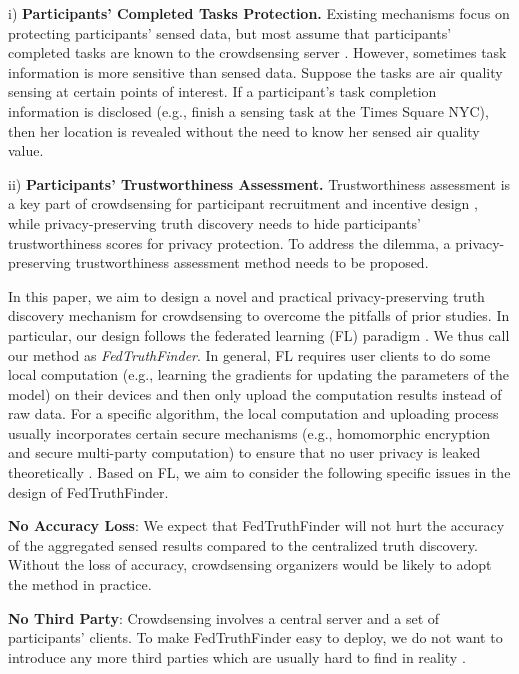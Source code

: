 i) \textbf{Participants' Completed Tasks Protection.} Existing mechanisms focus on protecting participants' sensed data, but most assume that participants' completed tasks are known to the crowdsensing server \citep{Xu2019EfficientAP,Miao2015CloudEnabledPT,Miao2019PrivacyPreservingTD,Zheng2018LearningTT}. However, sometimes task information is more sensitive than sensed data. Suppose the tasks are air quality sensing at certain points of interest. If a participant's task completion information is disclosed (e.g., finish a sensing task at the Times Square NYC), then her location is revealed without the need to know her sensed air quality value.

ii)  \textbf{Participants' Trustworthiness Assessment.} Trustworthiness assessment is a key part of crowdsensing for participant recruitment and incentive design \citep{Peng2018DataQG}, while privacy-preserving truth discovery needs to hide participants' trustworthiness scores for privacy protection. To address the dilemma, a privacy-preserving trustworthiness assessment method needs to be proposed.

In this paper, we aim to design a novel and practical privacy-preserving truth discovery mechanism for crowdsensing to overcome the pitfalls of prior studies. In particular, our design follows the federated learning (FL) paradigm \citep{konevcny2016federated,yang2019federated}. We thus call our method as \textit{FedTruthFinder}. In general, FL requires user clients to do some local computation (e.g., learning the gradients for updating the parameters of the model) on their devices and then only upload the computation results instead of raw data. For a specific algorithm, the local computation and uploading process usually incorporates certain secure mechanisms (e.g., homomorphic encryption and secure multi-party computation) to ensure that no user privacy is leaked theoretically \citep{chai2020secure,liu2020secure}. 
Based on FL, we aim to consider the following specific issues in the design of FedTruthFinder.


\textbf{No Accuracy Loss}: We expect that FedTruthFinder will not hurt the accuracy of the aggregated sensed results compared to the centralized truth discovery. Without the loss of accuracy, crowdsensing organizers would be likely to adopt the method in practice.

\textbf{No Third Party}: Crowdsensing involves a central server and a set of participants' clients. To make FedTruthFinder easy to deploy, we do not want to introduce any more third parties which are usually hard to find in reality \citep{Bonawitz2017PracticalSA,Wang2017LocationPT}.


